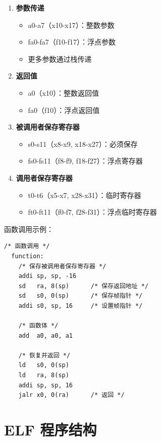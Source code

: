 \begin{enumerate}
  \item \textbf{参数传递}
    \begin{itemize}
      \item a0-a7（x10-x17）：整数参数
      \item fa0-fa7（f10-f17）：浮点参数
      \item 更多参数通过栈传递
    \end{itemize}

  \item \textbf{返回值}
    \begin{itemize}
      \item a0（x10）：整数返回值
      \item fa0（f10）：浮点返回值
    \end{itemize}

  \item \textbf{被调用者保存寄存器}
    \begin{itemize}
      \item s0-s11（x8-x9, x18-x27）：必须保存
      \item fs0-fs11（f8-f9, f18-f27）：浮点寄存器
    \end{itemize}

  \item \textbf{调用者保存寄存器}
    \begin{itemize}
      \item t0-t6（x5-x7, x28-x31）：临时寄存器
      \item ft0-ft11（f0-f7, f28-f31）：浮点临时寄存器
    \end{itemize}
\end{enumerate}

函数调用示例：
\begin{lstlisting}[language={[RISC-V]Assembler}]
  /* 函数调用 */
  function:
    /* 保存被调用者保存寄存器 */
    addi sp, sp, -16
    sd   ra, 8(sp)      /* 保存返回地址 */
    sd   s0, 0(sp)      /* 保存帧指针 */
    addi s0, sp, 16     /* 设置帧指针 */

    /* 函数体 */
    add  a0, a0, a1

    /* 恢复并返回 */
    ld   s0, 0(sp)
    ld   ra, 8(sp)
    addi sp, sp, 16
    jalr x0, 0(ra)      /* 返回 */
\end{lstlisting}

\section{ELF 程序结构}

